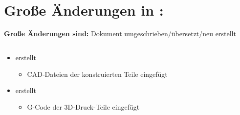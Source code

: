 %
%
%


\chapter{Große Änderungen in :}\label{gross}
\textbf{Große Änderungen sind:} Dokument umgeschrieben/übersetzt/neu erstellt


\section{}
	\begin{itemize}
	\item {} erstellt
		\begin{itemize}
		\item CAD-Dateien der konstruierten Teile eingefügt
	    \end{itemize}
	\item {} erstellt
		\begin{itemize}
		\item G-Code der 3D-Druck-Teile eingefügt
	    \end{itemize}
    \end{itemize}
    
    
    
